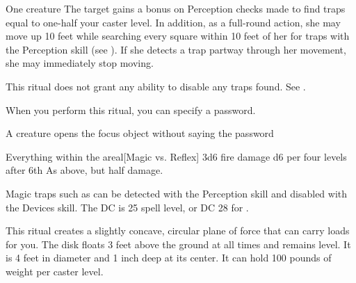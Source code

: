 
\spelldur{\durmed}
\begin{spelltarget}{One creature}
    \spelleffect The target gains a bonus on Perception checks made to find traps equal to one-half your caster level. In addition, as a full-round action, she may move up 10 feet while searching every square within 10 feet of her for traps with the Perception skill (see ). If she detects a trap partway through her movement, she may immediately stop moving.
\end{spelltarget}
\spellnotes This ritual does not grant any ability to disable any traps found. See .

\spellspecial When you perform this ritual, you can specify a password.
\spellline
\begin{spelltrigger}{A creature opens the focus object without saying the password}
    \begin{spelltargets}{Everything within the area}l[Magic vs. Reflex]
        \spellsuccess 3d6 fire damage \add d6 per four levels after 6th
        \spellfailure As above, but half damage.
    \end{spelltargets}
\end{spelltrigger}
\spellnotes \firespellnotes

\par Magic traps such as  can be detected with the Perception skill and disabled with the Devices skill. The DC is 25 \add spell level, or DC 28 for .

\spellrng{\rngmed}
\spelldur{\durext \dismissable}
\spellline
\spelleffect This ritual creates a slightly concave, circular plane of force that can carry loads for you. The disk floats 3 feet above the ground at all times and remains level. It is 4 feet in diameter and 1 inch deep at its center. It can hold 100 pounds of weight per caster level.

